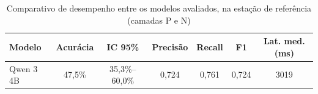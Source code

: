 \begin{table}[htbp!]
\centering
\caption{Comparativo de desempenho entre os modelos avaliados, na estação de referência (camadas P e N)}
\label{tab:resultados_comparativo_estacao}
\small
\begin{tabular}{|l|c|c|c|c|c|c|}
\hline
\textbf{Modelo} & \textbf{Acurácia} & \textbf{IC 95\%} & \textbf{Precisão} & \textbf{Recall} & \textbf{F1} & \textbf{Lat. med. (ms)} \\
\hline
Qwen 3 4B & 47,5\% & 35,3\%--60,0\% & 0,724 & 0,761 & 0,724 & 3019 \\
\hline
\end{tabular}
\end{table}
